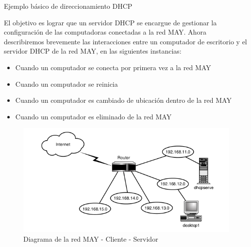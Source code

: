 \begin{frame}{Ejemplo básico de direccionamiento DHCP}
\begin{figure}
\begin{center}
    \end{center}
    \end{figure}

    El objetivo es lograr que un servidor DHCP se encargue de gestionar la
    configuración de las computadoras conectadas a la red MAY. Ahora
    describiremos brevemente las interacciones entre un computador de
    escritorio y el servidor DHCP de la red MAY, en las siguientes instancias:

    \begin{itemize}
        \item Cuando un computador se conecta por primera vez a la red MAY
        \item Cuando un computador se reinicia
        \item Cuando un computador es cambiado de ubicación dentro de la red MAY
        \item Cuando un computador es eliminado de la red MAY
    \end{itemize}

    \begin{figure}
    \begin{center}

    \includegraphics[scale=0.65]{images/2-3.png}
    \caption{Diagrama de la red MAY - Cliente - Servidor }
    \label{MAY-3}

    \end{center}
    \end{figure}

\end{frame}

